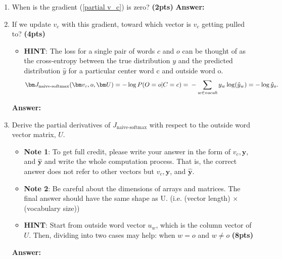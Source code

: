 \documentclass{assignment format}
\newenvironment{answer}{
    {\bf Answer:} \begingroup\color{red}
}{\endgroup}%
\begin{document}
\begin{enumerate}[label=(\alph*)]
	\item When is the gradient (\ref{partial v_c}) is zero? \textbf{(2pts)}
    \begin{answer}

     
    \end{answer}
    \item  If we update $v_c$ with this gradient, toward which vector is $v_c$ getting pulled to?  \textbf{(4pts)}
    \begin{itemize}
    \item \textbf{HINT}: The loss for a single pair of words $c$ and $o$ can be thought of as the cross-entropy between the true distribution \textbf{$y$} and the predicted distribution \textbf{$\hat{y}$} for a particular center word c and outside word o.
\begin{equation} 
\bm J_{\text{naive-softmax}}(\bm v_c, o, \bm U) = -\log P(O=o| C=c) =\\-\sum_{w \in vocab}y_w\log(\hat{y}_w)=-\log{\hat{y}_o}.
\label{naive-softmax}
\end{equation}

\end{itemize}
  \begin{answer}
 
    \end{answer}  
    \item Derive the partial derivatives of $J_{\text{naive-softmax}}$ with respect to the outside word vector matrix, $U$.
    \begin{itemize} 
\item \textbf{Note 1}: To get full credit, please write your answer in the form of $v_c, \mathbf{y}$, and $\hat{\mathbf{y}}$ and write the whole computation process. That is, the correct answer does not refer to other vectors but $v_c, \mathbf{y}$, and $\hat{\mathbf{y}}$. 
\item \textbf{Note 2}: Be careful about the dimensions of arrays and matrices. The final answer should have the same shape as U. (i.e. (vector length) $\times$ (vocabulary size)) 
\item\textbf{HINT}: Start from outside word vector $u_w$, which is the column vector of $U$. Then, dividing into two cases may help: when $w=o$ and $w \neq o$ \textbf{(8pts)}
\end{itemize}
\begin{answer}

    \end{answer}
\end{enumerate}
\end{document}

